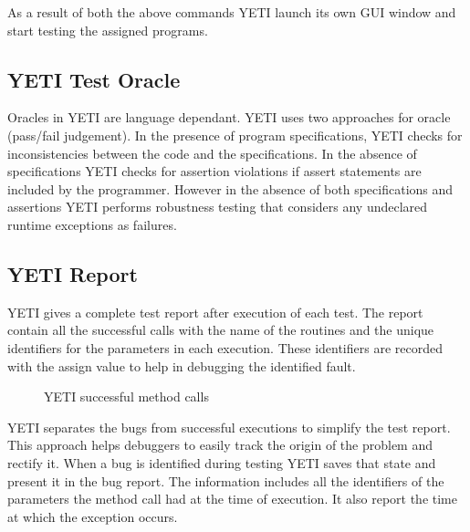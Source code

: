 As a result of both the above commands YETI launch its own GUI window and start testing the assigned programs. 

\subsection{YETI Test Oracle}
Oracles in YETI are language dependant. YETI uses two approaches for oracle (pass/fail judgement). In the presence of program specifications, YETI checks for inconsistencies between the code and the specifications. In the absence of specifications YETI checks for assertion violations if assert statements are included by the programmer. However in the absence of both specifications and assertions YETI performs robustness testing that considers any undeclared runtime exceptions as failures. 


\subsection{YETI Report}
YETI gives a complete test report after execution of each test. The report contain all the successful calls with the name of the routines and the unique identifiers for the parameters in each execution. These identifiers are recorded with the assign value to help in debugging the identified fault. 
\begin{figure}[h]
	\centering
	\caption{YETI successful method calls}
\end{figure}

YETI separates the bugs from successful executions to simplify the test report. This approach helps debuggers to easily track the origin of the problem and rectify it. When a bug is identified during testing YETI saves that state and present it in the bug report. The information includes all the identifiers of the parameters the method call had at the time of execution. It also report the time at which the exception occurs.

